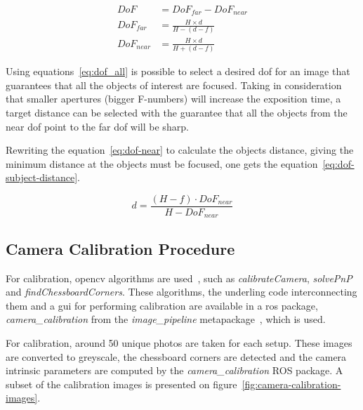 \begin{subequations}
	\label{eq:dof_all}
	\begin{align}
		DoF & = DoF_{far} - DoF_{near} \label{eq:dof} \\
		DoF_{far} & = \frac{H\times d}{H - (d - f)} \label{eq:dof-far} \\
		DoF_{near} & = \frac{H\times d}{H + (d - f)} \label{eq:dof-near} 
	\end{align}
\end{subequations}

Using equations~\ref{eq:dof_all} is possible to select a desired \acl{dof} for an image that guarantees that all the objects of interest are focused. Taking in consideration that smaller apertures (bigger F-numbers) will increase the exposition time\cite{Merklinger1993}, a target distance can be selected with the guarantee that all the objects from the near \ac{dof} point to the far \ac{dof} will be sharp.

Rewriting the equation~\ref{eq:dof-near} to calculate the objects distance, giving the minimum distance at the objects must be focused, one gets the equation~\ref{eq:dof-subject-distance}.

\begin{equation}
	\label{eq:dof-subject-distance}
	d = \frac{(H - f) \cdot DoF_{near}}{H - DoF_{near}}
\end{equation}


\subsection{Camera Calibration Procedure}
For calibration, \ac{opencv} algorithms are used~\cite{opencv_doc}, such as \emph{calibrateCamera}, \emph{solvePnP} and \emph{findChessboardCorners}. These algorithms, the underling code interconnecting them and a \ac{gui} for performing calibration are available in a \ac{ros} package, \emph{camera\_calibration} from the \emph{image\_pipeline} metapackage~\cite{cameraCalibrationRos}, which is used.

For calibration, around 50 unique photos are taken for each setup. These images are converted to greyscale, the chessboard corners are detected and the camera intrinsic parameters are computed by the \emph{camera\_calibration} ROS package. A subset of the calibration images is presented on figure~\ref{fig:camera-calibration-images}.

